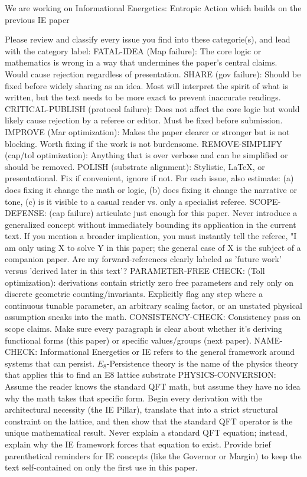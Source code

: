 We are working on Informational Energetics: Entropic Action which builds on the previous IE paper

Please review and classify every issue you find into these categorie(s), and lead with the category label:
FATAL-IDEA (Map failure): The core logic or mathematics is wrong in a way that undermines the paper's central claims. Would cause rejection regardless of presentation.
SHARE (gov failure): Should be fixed before widely sharing as an idea.  Most will interpret the spirit of what is written, but the text needs to be more exact to prevent inaccurate readings.
CRITICAL-PUBLISH (protocol failure): Does not affect the core logic but would likely cause rejection by a referee or editor. Must be fixed before submission.
IMPROVE (Mar optimization): Makes the paper clearer or stronger but is not blocking. Worth fixing if the work is not burdensome.
REMOVE-SIMPLIFY (cap/tol optimization): Anything that is over verbose and can be simplified or should be removed.
POLISH (substrate alignment): Stylistic, LaTeX, or presentational. Fix if convenient, ignore if not.
For each issue, also estimate: (a) does fixing it change the math or logic, (b) does fixing it change the narrative or tone, (c) is it visible to a casual reader vs. only a specialist referee.
SCOPE-DEFENSE: (cap failure) articulate just enough for this paper.  Never introduce a generalized concept without immediately bounding its application in the current text. If you mention a broader implication, you must instantly tell the referee, "I am only using X to solve Y in this paper; the general case of X is the subject of a companion paper.  Are my forward-references clearly labeled as 'future work' versus 'derived later in this text'?
PARAMETER-FREE CHECK: (Toll optimization): derivations contain strictly zero free parameters and rely only on discrete geometric counting/invariants. Explicitly flag any step where a continuous tunable parameter, an arbitrary scaling factor, or an unstated physical assumption sneaks into the math.
CONSISTENCY-CHECK: Consistency pass on scope claims. Make sure every paragraph is clear about whether it's deriving functional forms (this paper) or specific values/groups (next paper).
NAME-CHECK: Informational Energetics or IE refers to the general framework around systems that can persist.  $E_8$-Persistence theory is the name of the physics theory that applies this to find an E8 lattice substrate
PHYSICS-CONVERSION: Assume the reader knows the standard QFT math, but assume they have no idea why the math takes that specific form. Begin every derivation with the architectural necessity (the IE Pillar), translate that into a strict structural constraint on the lattice, and then show that the standard QFT operator is the unique mathematical result. Never explain a standard QFT equation; instead, explain why the IE framework forces that equation to exist. Provide brief parenthetical reminders for IE concepts (like the Governor or Margin) to keep the text self-contained on only the first use in this paper.

